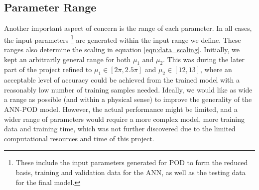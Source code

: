 \subsection{Parameter Range}
Another important aspect of concern is the range of each parameter. In all cases, the input parameters \footnote{These include the input parameters generated for POD to form the reduced basis, training and validation data for the ANN, as well as the testing data for the final model.} are generated within the input range we define. These ranges also determine the scaling in equation \ref{eqn:data_scaling}. Initially, we kept an arbitrarily general range for both $\mu_1$ and $\mu_2$. This was during the later part of the project refined to $\mu_1 \in [2\pi, 2.5\pi]$ and $\mu_2 \in [12, 13]$, where an acceptable level of accuracy could be achieved from the trained model with a reasonably low number of training samples needed. Ideally, we would like as wide a range as possible (and within a physical sense) to improve the generality of the ANN-POD model. However, the actual performance might be limited, and a wider range of parameters would require a more complex model, more training data and training time, which was not further discovered due to the limited computational resources and time of this project. 

\newpage